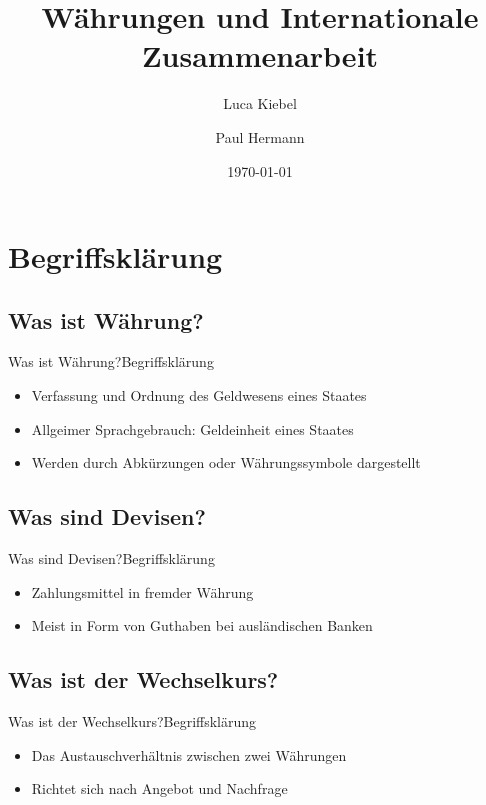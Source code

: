 \documentclass[10pt,a4paper, ngerman]{beamer}
\author{Luca Kiebel \and Paul Hermann}
\title{Währungen und Internationale Zusammenarbeit}
\date{\today}
\institute[HBBK]{Hans-Böckler-Berufskolleg}
\begin{document}
\begin{frame}
\titlepage
\end{frame}

\section{Begriffsklärung}
\subsection{Was ist Währung?}
\begin{frame}{Was ist Währung?}{Begriffsklärung}
\begin{itemize}
\item Verfassung und Ordnung des Geldwesens eines Staates \pause
\item Allgeimer Sprachgebrauch: Geldeinheit eines Staates \pause
\item  Werden durch Abkürzungen oder Währungssymbole dargestellt 
\end{itemize}
\end{frame}

\subsection{Was sind Devisen?}
\begin{frame}{Was sind Devisen?}{Begriffsklärung}
\begin{itemize}
		\item Zahlungsmittel in fremder Währung \pause
		\item Meist in Form von Guthaben bei ausländischen Banken
\end{itemize}
\end{frame}

\subsection{Was ist der Wechselkurs?}
\begin{frame}{Was ist der Wechselkurs?}{Begriffsklärung}
\begin{itemize}
\item Das Austauschverhältnis zwischen zwei Währungen \pause
\item Richtet sich nach Angebot und Nachfrage
\end{itemize}
\end{frame}
\end{document}
